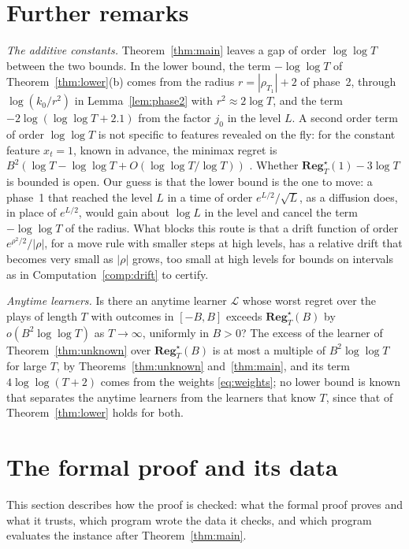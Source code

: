 \documentclass[12pt]{amsart}
\theoremstyle{definition}
\numberwithin{equation}{section}
\newcommand{\Regs}{\mathbf{Reg}^{\star}}
\begin{document}
\section{Further remarks}\label{sec:remarks}

\emph{The additive constants.} Theorem~\ref{thm:main} leaves a gap of order $\log\log T$ between the two bounds. In the lower bound, the term $-\log\log T$ of Theorem~\ref{thm:lower}(b) comes from the radius $r=|\rho_{T_1}|+2$ of phase~2, through $\log(k_0/r^2)$ in Lemma~\ref{lem:phase2} with $r^2\approx2\log T$, and the term $-2\log(\log\log T+2.1)$ from the factor $j_0$ in the level $L$. A second order term of order $\log\log T$ is not specific to features revealed on the fly: for the constant feature $x_t=1$, known in advance, the minimax regret is $B^2(\log T-\log\log T+O(\log\log T/\log T))$ \citep[Corollary~1 and Lemma~3, for their loss, which is half of ours]{TW00}. Whether $\Regs_T(1)-3\log T$ is bounded is open. Our guess is that the lower bound is the one to move: a phase~1 that reached the level $L$ in a time of order $e^{L/2}/\sqrt L$, as a diffusion does, in place of $e^{L/2}$, would gain about $\log L$ in the level and cancel the term $-\log\log T$ of the radius. What blocks this route is that a drift function of order $e^{\rho^2/2}/|\rho|$, for a move rule with smaller steps at high levels, has a relative drift that becomes very small as $|\rho|$ grows, too small at high levels for bounds on intervals as in Computation~\ref{comp:drift} to certify.

\emph{Anytime learners.} Is there an anytime learner $\mathcal L$ whose worst regret over the plays of length $T$ with outcomes in $[-B,B]$ exceeds $\Regs_T(B)$ by $o(B^2\log\log T)$ as $T\to\infty$, uniformly in $B>0$? The excess of the learner of Theorem~\ref{thm:unknown} over $\Regs_T(B)$ is at most a multiple of $B^2\log\log T$ for large $T$, by Theorems~\ref{thm:unknown} and~\ref{thm:main}, and its term $4\log\log(T+2)$ comes from the weights \eqref{eq:weights}; no lower bound is known that separates the anytime learners from the learners that know $T$, since that of Theorem~\ref{thm:lower} holds for both.

\section{The formal proof and its data}\label{sec:checks}
This section describes how the proof is checked: what the formal proof proves and what it trusts, which program wrote the data it checks, and which program evaluates the instance after Theorem~\ref{thm:main}.
\end{document}
